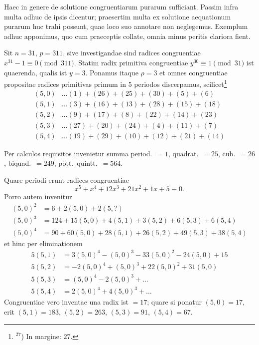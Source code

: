 \documentclass[12pt,a4paper]{article}
\begin{document}
Haec in genere de solutione congruentiarum purarum sufficiant. Passim infra multa adhuc de ipsis dicentur; praesertim multa ex solutione aequationum purarum huc trahi possunt, quae loco suo annotare non neglegemus. Exemplum adhuc apponimus, quo cum praeceptis collate, omnia minus peritis clariora fient.

Sit $n=31$, $p=311$, sive investigandae sind radices congruentiae $x^{31}-1\equiv 0\pmod{311}$. Statim radix primitiva congruentiae $y^{30}\equiv 1\pmod{31}$ ist quaerenda, qualis ist $y=3$. Ponamus itaque $\rho=3$ et omnes congruentiae propositae radices primitivas primum in $5$ periodos discerpamus, scilicet\footnote{$^{27}$) In margine: $27$.}
\[
\begin{aligned}
(5,0) &\ldots (1)+(26)+(25)+(30)+(5)+(6)\\
(5,1) &\ldots (3)+(16)+(13)+(28)+(15)+(18)\\
(5,2) &\ldots (9)+(17)+(8)+(22)+(14)+(23)\\
(5,3) &\ldots (27)+(20)+(24)+(4)+(11)+(7)\\
(5,4) &\ldots (19)+(29)+(10)+(12)+(21)+(14)
\end{aligned}
\]

Per calculos requisitos invenietur summa period.~$=1$, quadrat.~$=25$, cub.~$=26$, biquad.~$=249$, pott.~quintt.~$=564$.

Quare periodi erunt radices congruentiae
\[
x^5 + x^4 + 12x^3 + 21x^2 + 1x + 5 \equiv 0.
\]
Porro autem invenitur
\[
\begin{aligned}
(5,0)^2 &= 6 + 2(5,0) + 2(5,?)\\
(5,0)^3 &= 124 + 15(5,0) + 4(5,1) + 3(5,2) + 6(5,3) + 6(5,4)\\
(5,0)^4 &= 90 + 60(5,0) + 28(5,1) + 26(5,2) + 49(5,3) + 38(5,4)
\end{aligned}
\]
et hinc per eliminationem
\[
\begin{aligned}
5(5,1) &= 3(5,0)^4 - (5,0)^3 - 33(5,0)^2 - 24(5,0) + 15\\
5(5,2) &= -2(5,0)^4 + (5,0)^3 + 22(5,0)^2 + 31(5,0)\\
5(5,3) &= (5,0)^4 - 2(5,0)^3 + \ldots\\
5(5,4) &= 2(5,0)^4 + 4(5,0)^3 + \ldots
\end{aligned}
\]
Congruentiae vero inventae una radix ist $=17$; quare si ponatur $(5,0)=17$, erit $(5,1)=183$, $(5,2)=263$, $(5,3)=91$, $(5,4)=67$.
\end{document}
